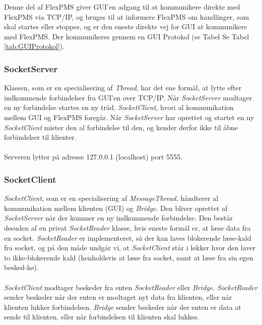 Denne del af FlexPMS giver GUI'en adgang til at kommunikere direkte med FlexPMS via TCP/IP, og bruges til at informere FlexPMS om handlinger, som skal startes eller stoppes, og er den eneste direkte vej for GUI at kommunikere med FlexPMS. Der kommunikeres gennem en GUI Protokol (se Tabel Se Tabel \ref{tab:GUIProtokol}).




\subsubsection{SocketServer}
Klassen, som er en specialisering af \textit{Thread}, har det ene formål, at lytte efter indkommende forbindelser fra GUI’en over TCP/IP. Når \textit{SocketServer} modtager en ny forbindelse startes en ny tråd, \textit{SocketClient}, hvori al kommunikation mellem GUI og FlexPMS foregår. Når \textit{SocketServer} har oprettet og startet en ny \textit{SocketClient} mister den al forbindelse til den, og kender derfor ikke til åbne forbindelser til klienter.\\\\

Serveren lytter på adresse 127.0.0.1 (localhost) port 5555.



\subsubsection{SocketClient}

\textit{SocketClient}, som er en specialisering af \textit{MessageThread}, håndterer al kommunikation mellem klienten (GUI) og \textit{Bridge}. Den bliver oprettet af \textit{SocketServer} når der kommer en ny indkommende forbindelse. Den består desuden af en privat \textit{SocketReader} klasse, hvis eneste formål er, at læse data fra en socket. \textit{SocketReader} er implementeret, så der kan laves blokerende læse-kald fra socket, og på den måde undgår vi, at \textit{SocketClient} står i løkker hvor den laver to ikke-blokerende kald (henholdsvis at læse fra socket, samt at læse fra sin egen besked-kø).\\\\

\textit{SocketClient} modtager beskeder fra enten \textit{SocketReader} eller \textit{Bridge}. \textit{SocketReader} sender beskeder når der enten er modtaget nyt data fra klienten, eller når klienten lukker forbindelsen. \textit{Bridge} sender beskeder når der enten er data at sende til klienten, eller når forbindelsen til klienten skal lukkes.\\\\

